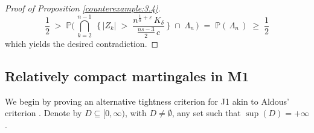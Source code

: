 \documentclass[11pt]{article}
\theoremstyle{definition}\newtheorem{example}[theorem]{Example}
\theoremstyle{definition}\newtheorem{counterexample}[theorem]{Counterexample}
\theoremstyle{definition}\newtheorem{remark}[theorem]{Remark}
\theoremstyle{definition}\newtheorem{defi}[theorem]{Definition}
\numberwithin{equation}{section}
\newcommand{\Pro}{\mathbb{P}}										%
\newcommand{\intersection}[2]{\overset{#2}{\bigcap\limits_{#1}}\;}				%
\renewcommand{\|}{\; : \, \;}											%
\begin{document}
\begin{proof}[Proof of Proposition \ref{counterexample:3.4}]
	$$ \frac{1}{2} \; > \; \Pro \Biggl( \, \intersection{k=2}{n-1} \, \biggl\{ \, |Z_{k}|  \; > \; \frac{n^{\frac 1 \alpha+\varepsilon}\, K_\delta}{\frac{ns-3}{2} \, c}  \, \biggr\} \; \cap \; \Lambda_n \, \Biggr) \; = \; \Pro \left( \, \Lambda_n \, \right) \; \ge \; \frac{1}{2}$$
	which yields the desired contradiction.
\end{proof}


\subsection{Relatively compact martingales in M1}

We begin by proving an alternative tightness criterion for J1 akin to Aldous' criterion \cite[Thm.~16.10]{billingsley}. Denote by $D\subseteq [0,\infty)$, with $D \neq \emptyset$, any set such that $\operatorname{sup}(D)=+\infty$.
\end{document}
